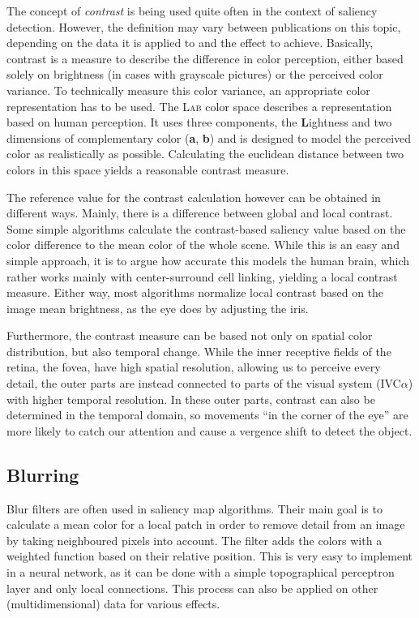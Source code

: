 \documentclass[a4paper,12pt,fleqn,oneside]{scrartcl}
\begin{document}
The concept of \textit{contrast} is being used quite often in the context of saliency detection. However, the definition
may vary between publications on this topic, depending on the data it is applied to and the effect to achieve.
Basically, contrast is a measure to describe the difference in color perception, either based solely on brightness (in
cases with grayscale pictures) or the perceived color variance.  To technically measure this color variance, an
appropriate color representation has to be used. The \textsc{Lab} color space describes a representation based on human
perception. It uses three components, the \textbf{L}ightness and two dimensions of  complementary color (\textbf{a},
\textbf{b}) and is designed to model the perceived color as realistically as possible. Calculating the euclidean
distance between two colors in this space yields a reasonable contrast measure.

The reference value for the contrast calculation however can be obtained in different ways. Mainly, there is a
difference between global and local contrast. Some simple algorithms calculate the contrast-based saliency value based
on the color difference to the mean color of the whole scene. While this is an easy and simple approach, it is to argue
how accurate this models the human brain, which rather works mainly with center-surround cell linking, yielding a local
contrast measure. Either way, most algorithms normalize local contrast based on the image mean brightness, as the eye
does by adjusting the iris.

Furthermore, the contrast measure can be based not only on spatial color distribution, but also temporal change. While
the inner receptive fields of the retina, the fovea, have high spatial resolution, allowing us to perceive every detail,
the outer parts are instead connected to parts of the visual system (IVC$\alpha$) with higher temporal resolution. In
these outer parts, contrast can also be determined in the temporal domain, so movements ``in the corner of the eye'' are
more likely to catch our attention and cause a vergence shift to detect the object.

\subsection{Blurring}

Blur filters are often used in saliency map algorithms. Their main goal is to calculate a mean color for a local patch
in order to remove detail from an image  by taking neighboured pixels into account. The filter adds the colors with a
weighted function based on their relative position. This is very easy to implement in a neural network, as it can be
done with a simple topographical perceptron  layer and only local connections.  This process can also be applied on
other (multidimensional) data for various effects.
\end{document}
